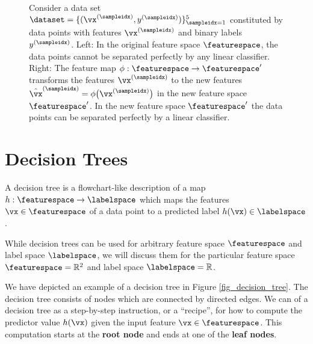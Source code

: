 \documentclass[12pt]{report}
\begin{document}
\begin{figure}[htbp]
\begin{center}
\begin{minipage}{0.45\textwidth}
\begin{tikzpicture}[auto,scale=0.6]
   \end{tikzpicture}
\end{minipage}
\caption{Consider a data set $\dataset = \{ (\vx^{(\sampleidx)},y^{(\sampleidx)}) \}_{\sampleidx=1}^{5}$ constituted 
by data points with features $\vx^{(\sampleidx)}$ and binary labels $y^{(\sampleidx)}$. Left: In the original feature 
space $\featurespace$, the data points cannot be separated perfectly by any linear classifier. Right: The feature 
map $\phi: \featurespace \rightarrow \featurespace'$ transforms the features $\vx^{(\sampleidx)}$ to the new features 
$\hat{\vx}^{(\sampleidx)}=\phi\big(\vx^{(\sampleidx)}\big)$ in the new feature space $\featurespace'$. In the new 
feature space $\featurespace'$ the data points can be separated perfectly by a linear classifier. }
\label{fig_kernelmethods}
\end{center}
\end{figure}


\newpage
\section{Decision Trees} 
\label{sec_decision_trees}

A decision tree is a flowchart-like description of a map 
$h: \featurespace \rightarrow \labelspace$ which maps 
the features $\vx \in \featurespace$ of a data point to a 
predicted label $h(\vx) \in \labelspace$ \cite{hastie01statisticallearning}. 

While decision trees can be used for arbitrary feature space 
$\featurespace$ and label space $\labelspace$, we will discuss 
them for the particular feature space $\featurespace = \mathbb{R}^{2}$ 
and label space $\labelspace=\mathbb{R}$. %

We have depicted an example of a decision tree in Figure \ref{fig_decision_tree}. 
The decision tree consists of nodes which are connected by directed edges. We 
can of a decision tree as a step-by-step instruction, or a ``recipe'', for how to 
compute the predictor value $h(\vx)$ given the input feature $\vx \in \featurespace$. 
This computation starts at the {\bf root node} and ends at one of the {\bf leaf nodes}. 
\end{document}
